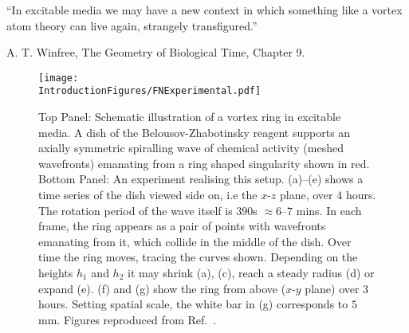 \setlength{\epigraphwidth}{5in} 
\epigraph{``In excitable media we may have a new context in which something like a vortex atom theory can live again, strangely transfigured.''}{A. T. Winfree, The Geometry of Biological Time, Chapter 9.}
\begin{figure}[htbp]
\centering
\texttt{[image: \\IntroductionFigures/FNExperimental.pdf]}
\caption{Top Panel: Schematic illustration of a vortex ring in excitable media. A dish of the Belousov-Zhabotinsky reagent supports an axially symmetric spiralling wave of chemical activity (meshed wavefronts) emanating from a ring shaped singularity shown in red. Bottom Panel: An experiment realising this setup. (a)--(e) shows a time series of the dish viewed side on, i.e the $x$-$z$ plane, over $4$ hours. The rotation period of the wave itself is $390$s $\approx 6$--$ 7 $ mins. In each frame, the ring appears as a pair of points with wavefronts emanating from it, which collide in the middle of the dish. Over time the ring moves, tracing the curves shown. Depending on the heights $h_1$ and $h_2$ it may shrink (a), (c), reach a steady radius (d) or expand (e). (f) and (g) show the ring from above ($x$-$y$ plane) over $3$ hours. Setting spatial scale, the white bar in (g) corresponds to $5$ mm. Figures reproduced from Ref.~\citep{Totz2015}.}
\label{fig:FNExperimental}
\end{figure}

